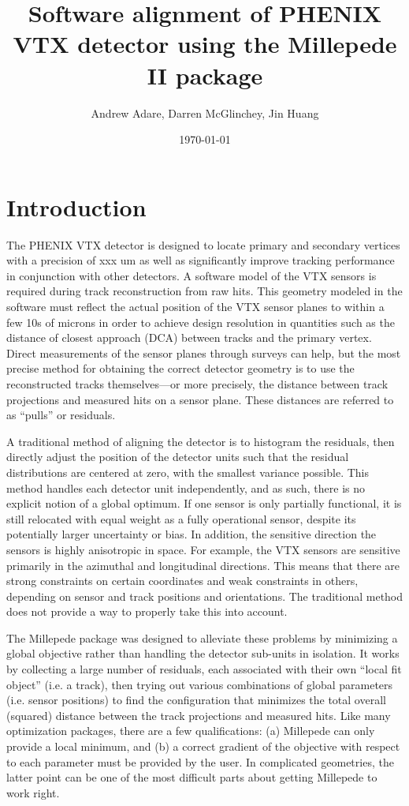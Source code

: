 \documentclass{article}
\title{Software alignment of PHENIX VTX detector using the Millepede II package}
\author{Andrew Adare, Darren McGlinchey, Jin Huang}
\date{\today}
\begin{document}
\maketitle
\section{Introduction}
The PHENIX VTX detector is designed to locate primary and secondary vertices with a precision of xxx um as well as significantly improve tracking performance in conjunction with other detectors. A software model of the VTX sensors is required during track reconstruction from raw hits. This geometry modeled in the software must reflect the actual position of the VTX sensor planes to within a few 10s of microns in order to achieve design resolution in quantities such as the distance of closest approach (DCA) between tracks and the primary vertex. Direct measurements of the sensor planes through surveys can help, but the most precise method for obtaining the correct detector geometry is to use the reconstructed tracks themselves---or more precisely, the distance between track projections and measured hits on a sensor plane. These distances are referred to as ``pulls'' or residuals.

A traditional method of aligning the detector is to histogram the residuals, then directly adjust the position of the detector units such that the residual distributions are centered at zero, with the smallest variance possible. This method handles each detector unit independently, and as such, there is no explicit notion of a global optimum. If one sensor is only partially functional, it is still relocated with equal weight as a fully operational sensor, despite its potentially larger uncertainty or bias. In addition, the sensitive direction the sensors is highly anisotropic in space. For example, the VTX sensors are sensitive primarily in the azimuthal and longitudinal directions. This means that there are strong constraints on certain coordinates and weak constraints in others, depending on sensor and track positions and orientations. The traditional method does not provide a way to properly take this into account.

The Millepede package was designed to alleviate these problems by minimizing a global objective rather than handling the detector sub-units in isolation. It works by collecting a large number of residuals, each associated with their own ``local fit object'' (i.e. a track), then trying out various combinations of global parameters (i.e. sensor positions) to find the configuration that minimizes the total overall (squared) distance between the track projections and measured hits. Like many optimization packages, there are a few qualifications: (a) Millepede can only provide a local minimum, and (b) a correct gradient of the objective with respect to each parameter must be provided by the user. In complicated geometries, the latter point can be one of the most difficult parts about getting Millepede to work right.
\end{document}
